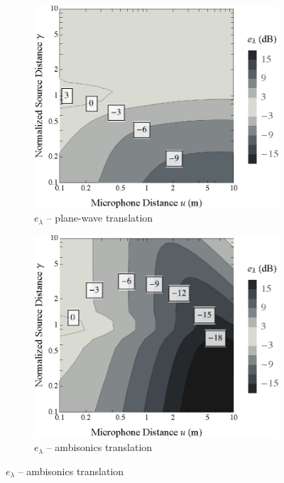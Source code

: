 \begin{figure}[tbp]
    	\centering
    	\begin{subfigure}[b]{0.49\textwidth}
        		\includegraphics[width=\textwidth]{07_characterization_extrapolation/figures/audibleEnergy_contour_pwt.eps}
        		\caption{$e_\lambda$ -- plane-wave translation}
        		\label{fig:07_Characterization_Extrapolation:Level_Errors:PWT}
    	\end{subfigure}
	\hfill
    	\begin{subfigure}[b]{0.49\textwidth}
        		\includegraphics[width=\textwidth]{07_characterization_extrapolation/figures/audibleEnergy_contour_sre.eps}
        		\caption{$e_\lambda$ -- ambisonics translation}
        		\label{fig:07_Characterization_Extrapolation:Level_Errors:SRE}
    	\end{subfigure}
	

\end{figure}

